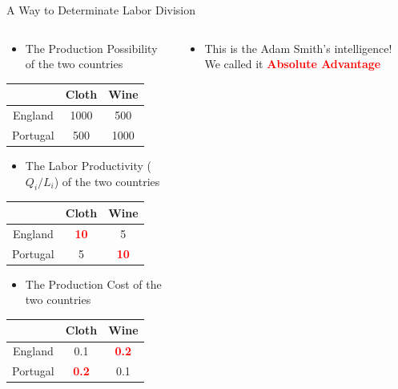 \documentclass[10pt,hyperref={CJKbookmarks=true},xcolor=dvipsnames,aspectratio=169]{beamer}
\begin{document}
\begin{frame}{A Way to Determinate Labor Division}
\begin{columns}
  \begin{column}{0.6\textwidth}


\begin{itemize}
\item The Production Possibility of the two countries
\end{itemize}

\begin{center}
\begin{tabular}{|c|c|c|}
\hline 
& Cloth & Wine\tabularnewline
\hline 
\hline 
England & 1000 & 500\tabularnewline
\hline 
Portugal & 500 & 1000\tabularnewline
\hline 
\end{tabular}
\par\end{center}
\begin{itemize}
\item The Labor Productivity ($Q_{i}/L_{i}$) of the two countries 
\end{itemize}

\pause{}


\begin{center}
\begin{tabular}{|c|c|c|}
\hline 
& Cloth & Wine\tabularnewline
\hline 
\hline 
England & \textbf{\textcolor{red}{10}} & 5\tabularnewline
\hline 
Portugal & 5 & \textbf{\textcolor{red}{10}}\tabularnewline
\hline 
\end{tabular}
\par\end{center}
\begin{itemize}
\item The Production Cost of the two countries
\end{itemize}

\pause{}


\begin{center}
\begin{tabular}{|c|c|c|}
\hline 
& Cloth & Wine\tabularnewline
\hline 
\hline 
England & 0.1 & \textbf{\textcolor{red}{0.2}}\tabularnewline
\hline 
Portugal & \textbf{\textcolor{red}{0.2}} & 0.1\tabularnewline
\hline 
\end{tabular}
\par\end{center}
\end{column} 
 \begin{column}{0.4\textwidth}

\begin{itemize}
\item This is the Adam Smith's intelligence! We called it \textbf{\textcolor{red}{Absolute
Advantage}}
\end{itemize}
\end{column}
\end{columns}
\end{frame}
\end{document}
